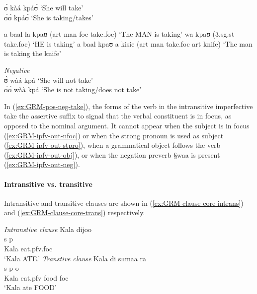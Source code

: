 \begin{exe}
\ex\label{ex:GRM-pos-neg-take}
\begin{xlist}

 ʊ̀ kàá kpáʊ̀   `She will take'\\
   ʊ̀ʊ̀ kpáʊ́ 	 `She  is taking/takes'

\begin{xlist}
\ex\label{ex:GRM-ipfv-out-nfoc}
\textasteriskcentered  a baal la  kpaʊ ({\sc art} man {\sc foc} take.{\sc foc})
`The MAN is taking'
\ex\label{ex:GRM-ipfv-out-stpro}
 \textasteriskcentered  wa  kpaʊ ({\sc 3.sg.st} take.{\sc foc})  `HE is
taking'
\ex\label{ex:GRM-ipfv-out-obj}
\textasteriskcentered  a baal   kpaʊ a kisie ({\sc art} man take.{\sc foc} {\sc
art} knife) `The man is taking the knife'
\end{xlist}

\ex\label{ex:GRM-ipfv-out-neg}{\it Negative}\\
 ʊ̀ wàá kpá   `She will not take'\\
   ʊ̀ʊ̀   wàà	 kpá `She  is not taking/does not take'

\end{xlist}
\end{exe}

In (\ref{ex:GRM-pos-neg-take}), the forms of the verb in the
intransitive imperfective take the assertive suffix to signal that the verbal
constituent is in focus, as opposed to the nominal argument. It cannot appear
when the subject is in focus (\ref{ex:GRM-ipfv-out-nfoc}) or when the strong
pronoun is used as subject (\ref{ex:GRM-ipfv-out-stpro}), when a grammatical
object follows the verb  (\ref{ex:GRM-ipfv-out-obj}), or when the negation
preverb {\S waa} is present  (\ref{ex:GRM-ipfv-out-neg}).



\paragraph{Intransitive vs. transitive}
\label{sec:GRM-trans-intran}

Intransitive  and transitive clauses are shown in  
(\ref{ex:GRM-clause-core-intrans}) and (\ref{ex:GRM-clause-core-trans})
respectively.  



\begin{exe}
\ex\label{ex:GRM-clause-core}
\begin{xlist}
 \ex\label{ex:GRM-clause-core-intrans}{\it Intranstive clause}
\glll Kala dijoo \\
       {\sc s} {\sc p}\\
 Kala eat.{\sc pfv.foc} \\
\glt  `Kala ATE.' 
\ex\label{ex:GRM-clause-core-trans}{\it Transtive clause}
\glll Kala di sɪɪmaa ra\\
        {\sc s} {\sc p}  {\sc o} {} \\
Kala eat.{\sc pfv}  food {\sc foc}\\
\glt  `Kala ate FOOD' 
\end{xlist}
\end{exe}


